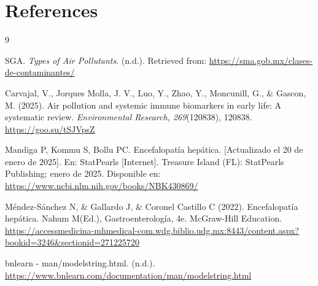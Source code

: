 \documentclass[twocolumn]{article}
\begin{document}
\section{References}

\begin{thebibliography}{9}
\setlength{\itemsep}{0pt}
\setlength{\parskip}{0pt}

SGA. \textit{Types of Air Pollutants}. (n.d.). 
Retrieved from: \url{https://sma.gob.mx/clases-de-contaminantes/}
\vspace{0.3cm}

Carvajal, V., Jorques Molla, J. V., Luo, Y., Zhao, Y., Moncunill, G., \& Gascon, M. (2025). 
Air pollution and systemic immune biomarkers in early life: A systematic review. 
\textit{Environmental Research, 269}(120838), 120838. 
\url{https://goo.su/tSJVpsZ}

\vspace{0.3cm}


Mandiga P, Kommu S, Bollu PC. Encefalopatía hepática. [Actualizado el 20 de enero de 2025]. En: StatPearls [Internet]. Treasure Island (FL): StatPearls Publishing; enero de 2025. Disponible en: \url{https://www.ncbi.nlm.nih.gov/books/NBK430869/}
\vspace{0.3cm}


Méndez-Sánchez N, \& Gallardo J, \& Coronel Castillo C (2022). Encefalopatía hepática. Nahum M(Ed.), Gastroenterología, 4e. McGraw-Hill Education. \url{https://accessmedicina-mhmedical-com.wdg.biblio.udg.mx:8443/content.aspx?bookid=3246&sectionid=271225720}
\vspace{0.3cm}

bnlearn - man/modelstring.html. (n.d.). \url{https://www.bnlearn.com/documentation/man/modelstring.html}
\end{thebibliography}
\end{document}
